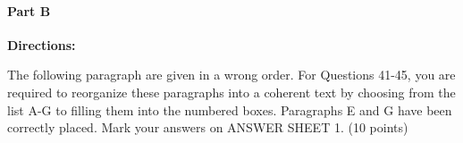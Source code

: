 \paragraph{Part B}

\textbf{Directions:}

The following paragraph are given in a wrong order. For Questions 41-45, you are required to reorganize these paragraphs into a coherent text by choosing from the list A-G to filling them into the numbered boxes. Paragraphs E and G have been correctly placed. Mark your answers on ANSWER SHEET 1. (10 points)

\vspace{6pt}